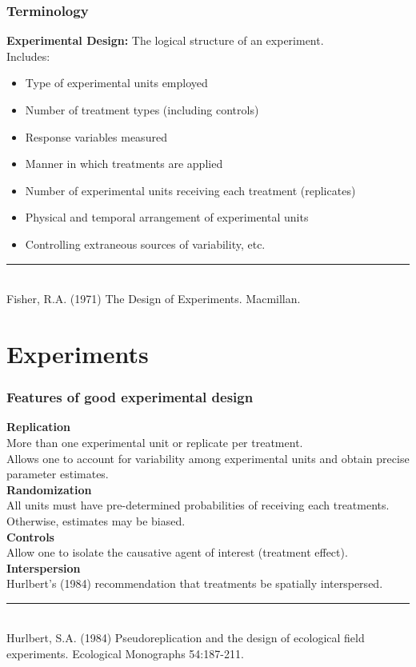 \documentclass[color=usenames,dvipsnames]{beamer}\usepackage[]{graphicx}\usepackage[]{xcolor}
\begin{document}
\begin{frame}
  \frametitle{Terminology}
  {\bf Experimental Design:} %
  The logical structure of an experiment. \\ %
  \vspace{6pt}
  \vfill  
  Includes:
  \begin{itemize}
    \item Type of experimental units employed
    \item Number of treatment types (including controls)
    \item Response variables measured
    \item Manner in which treatments are applied
    \item Number of experimental units receiving each treatment (replicates)
    \item Physical and temporal arrangement of experimental units
    \item Controlling extraneous sources of variability, etc.
  \end{itemize}
  \vfill
  \vspace{6pt}
  \rule[0mm]{1cm}{0.1mm} \\
  \footnotesize
  Fisher, R.A. (1971) The Design of Experiments. Macmillan. 
\end{frame}




\section{Experiments}


\begin{frame}
  \frametitle{Features of good experimental design}
  \pause
  \small
  {\bf Replication} \\
  More than one experimental unit or replicate per treatment. \\
  Allows one to account for variability among experimental units and
  obtain precise parameter estimates. \\
  \pause
  \vfill
  {\bf Randomization} \\
  All units must have pre-determined probabilities of receiving each
  treatments. Otherwise, estimates may be biased. \\
  \pause
  \vfill
  {\bf Controls} \\
  Allow one to isolate the causative agent of interest (treatment
  effect). \\ %
  \pause
  \vfill
  {\bf Interspersion} \\
  Hurlbert's (1984) recommendation that treatments be spatially interspersed.  \\
  \vspace{1pt}
  \rule[0mm]{1cm}{0.1mm} \\
  \footnotesize
  Hurlbert, S.A. (1984) Pseudoreplication and the design of ecological field
  experiments.  Ecological Monographs 54:187-211.
\end{frame}
\end{document}
